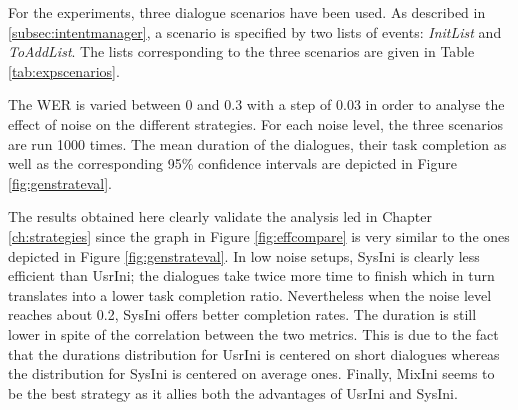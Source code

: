 \begin{figure*}[t!]
\begin{subfigure}[t]{.5\textwidth}
                  \end{subfigure}
                  \caption{Simulated mean duration (left) and dialogue task completion (right) for different noise levels}
                    \label{fig:genstrateval}
              \end{figure*}
              
  		For the experiments, three dialogue scenarios have been used. As described in \ref{subsec:intentmanager}, a scenario is specified by two lists of events: \textit{InitList} and \textit{ToAddList}. The lists corresponding to the three scenarios are given in Table \ref{tab:expscenarios}.
        
       	The WER is varied between 0 and 0.3 with a step of 0.03 in order to analyse the effect of noise on the different strategies. For each noise level, the three scenarios are run 1000 times. The mean duration of the dialogues, their task completion as well as the corresponding 95\% confidence intervals are depicted in Figure \ref{fig:genstrateval}.
        
        The results obtained here clearly validate the analysis led in Chapter \ref{ch:strategies} since the graph in Figure \ref{fig:effcompare} is very similar to the ones depicted in Figure \ref{fig:genstrateval}. In low noise setups, SysIni is clearly less efficient than UsrIni; the dialogues take twice more time to finish which in turn translates into a lower task completion ratio. Nevertheless when the noise level reaches about 0.2, SysIni offers better completion rates. The duration is still lower in spite of the correlation between the two metrics. This is due to the fact that the durations distribution for UsrIni is centered on short dialogues whereas the distribution for SysIni is centered on average ones. Finally, MixIni seems to be the best strategy as it allies both the advantages of UsrIni and SysIni.
        
        
